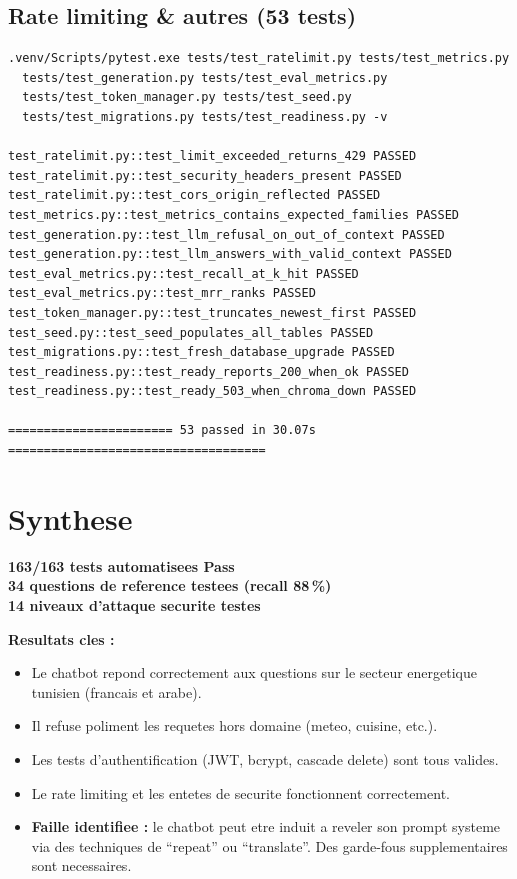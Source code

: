 \documentclass[12pt,a4paper,oneside]{article}
\begin{document}
\subsection{Rate limiting \& autres (53 tests)}

\begin{verbatim}
.venv/Scripts/pytest.exe tests/test_ratelimit.py tests/test_metrics.py
  tests/test_generation.py tests/test_eval_metrics.py
  tests/test_token_manager.py tests/test_seed.py
  tests/test_migrations.py tests/test_readiness.py -v

test_ratelimit.py::test_limit_exceeded_returns_429 PASSED
test_ratelimit.py::test_security_headers_present PASSED
test_ratelimit.py::test_cors_origin_reflected PASSED
test_metrics.py::test_metrics_contains_expected_families PASSED
test_generation.py::test_llm_refusal_on_out_of_context PASSED
test_generation.py::test_llm_answers_with_valid_context PASSED
test_eval_metrics.py::test_recall_at_k_hit PASSED
test_eval_metrics.py::test_mrr_ranks PASSED
test_token_manager.py::test_truncates_newest_first PASSED
test_seed.py::test_seed_populates_all_tables PASSED
test_migrations.py::test_fresh_database_upgrade PASSED
test_readiness.py::test_ready_reports_200_when_ok PASSED
test_readiness.py::test_ready_503_when_chroma_down PASSED

======================= 53 passed in 30.07s ====================================
\end{verbatim}

\clearpage

\section*{Synthese}

\begin{center}
\colorbox{PassGreen!15}{\parbox{0.9\textwidth}{\centering\large\bfseries
163/163 tests automatisees Pass\\[0.3cm]
34 questions de reference testees (recall 88\,\%)\\[0.3cm]
14 niveaux d'attaque securite testes
}}
\end{center}

\bigskip

\noindent\textbf{Resultats cles :}
\begin{itemize}[leftmargin=1.2cm]
\item Le chatbot repond correctement aux questions sur le secteur energetique tunisien (francais et arabe).
\item Il refuse poliment les requetes hors domaine (meteo, cuisine, etc.).
\item Les tests d'authentification (JWT, bcrypt, cascade delete) sont tous valides.
\item Le rate limiting et les entetes de securite fonctionnent correctement.
\item \textbf{Faille identifiee :} le chatbot peut etre induit a reveler son prompt systeme via des techniques de ``repeat'' ou ``translate''. Des garde-fous supplementaires sont necessaires.
\end{itemize}
\end{document}

